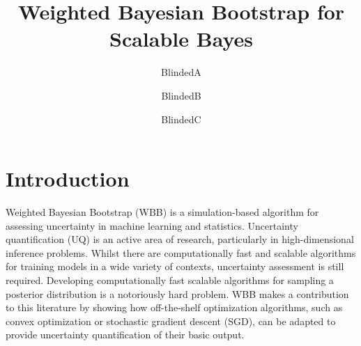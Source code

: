 \documentclass[12pt]{TD-CJS}
\begin{document}


\title{Weighted Bayesian Bootstrap for Scalable Bayes}
\author{BlindedA}
\author{BlindedB}
\author{BlindedC}


\makechaptertitle



\newpage

\section{Introduction}
Weighted Bayesian Bootstrap (WBB) is a simulation-based algorithm for assessing uncertainty in machine learning and statistics. Uncertainty quantification (UQ) is an active area of research, particularly in high-dimensional inference problems. Whilst there are computationally fast and scalable algorithms for training models in a wide variety of contexts, uncertainty assessment is still required. Developing computationally fast scalable algorithms for sampling a posterior distribution is a notoriously hard problem. WBB makes a contribution to this literature by showing how off-the-shelf optimization algorithms, such as convex optimization or stochastic gradient descent (SGD), can be adapted to 
provide uncertainty quantification of their basic output.
 
\end{document}
